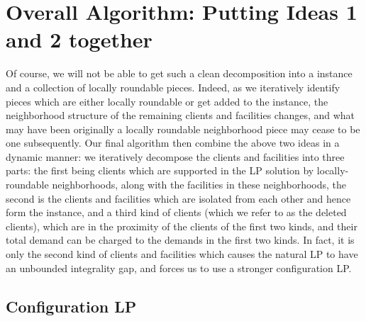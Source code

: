 \section{Overall Algorithm: Putting Ideas 1 and 2 together}
Of course, we will not be able to get such a clean decomposition into a \cckp instance and a collection of locally roundable pieces. Indeed, as we iteratively identify pieces which are either locally roundable or get added to the \cckp instance, the neighborhood structure of the remaining clients and facilities changes, and what may have been originally a locally roundable neighborhood piece may cease to be one subsequently. Our final algorithm then combine the above two ideas in a dynamic manner: we iteratively decompose the clients and facilities into three parts: the first being clients which are supported in the LP solution by locally-roundable neighborhoods, along with the facilities in these neighborhoods, the second is the clients and facilities which are isolated from each other and hence form the \cckp instance, and a third kind of clients (which we refer to as the deleted clients), which are in the proximity of the clients of the first two kinds, and their total demand can be charged to the demands in the first two kinds.
In fact, it is only the second kind of clients and facilities which causes the natural LP to have an unbounded integrality gap, and forces us to use a stronger configuration LP.


\subsection{Configuration LP}

